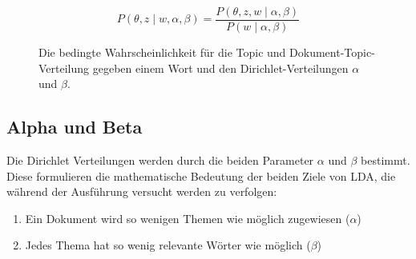 \documentclass[german,version-2020-11]{uzl-thesis}
\begin{document}
\begin{figure}[H]
\begin{center}
\begin{equation}
P(\theta, z \mid w, \alpha, \beta) = \frac{P(\theta, z, w \mid \alpha, \beta)}{P(w \mid \alpha, \beta)}
\end{equation}
\end{center}
\caption{Die bedingte Wahrscheinlichkeit für die Topic und Dokument-Topic-Verteilung gegeben einem Wort und den Dirichlet-Verteilungen $\alpha$ und $\beta$.}
\label{fig:equ2}
\end{figure}


\subsection{Alpha und Beta}
Die Dirichlet Verteilungen werden durch die beiden Parameter $\alpha$ und $\beta$ bestimmt. Diese formulieren die mathematische Bedeutung der beiden Ziele von LDA, die während der Ausführung versucht werden zu verfolgen:

\begin{enumerate}
	\item Ein Dokument wird so wenigen Themen wie möglich zugewiesen ($\alpha$)
	\item Jedes Thema hat so wenig relevante Wörter wie möglich ($\beta$)
\end{enumerate}
\end{document}
